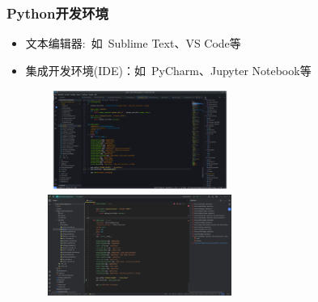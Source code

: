 \begin{frame}
	\frametitle{\textrm{Python}开发环境}
    \begin{itemize}
	    \item 文本编辑器:~如~\textrm{Sublime Text}、\textrm{VS Code}等
	    \item 集成开发环境\textrm{(IDE)}：如~\textrm{PyCharm}、\textrm{Jupyter Notebook}等
    \end{itemize}
\begin{figure}[h!]
\vspace*{-0.10in}
\centering
\includegraphics[height=1.3in, width=2.6in, viewport=0 0 1560 800,clip]{Figures/VS_code-python.png}
\includegraphics[height=1.3in, width=2.6in, viewport=0 0 1520 834,clip]{Figures/Pycharm-python.png}
\label{Python-editor}
\end{figure}
\end{frame}


